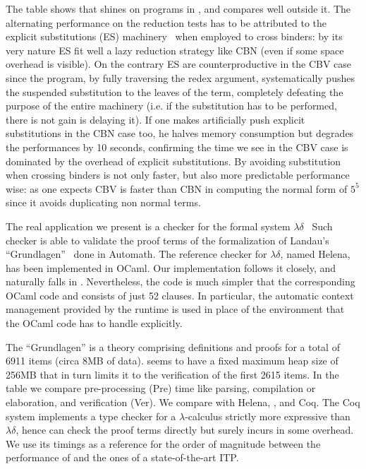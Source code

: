 \documentclass{llncs}
\begin{document}
The table shows that \elpi{} shines on programs in \rff{}, and compares well
outside it. The alternating performance \tedius{} on the reduction tests has
to be attributed to the explicit substitutions (ES) machinery~\cite{DBLP:journals/jar/LiangNQ04} when employed to cross binders:
by its very nature ES fit well a lazy reduction strategy like
CBN (even if some space
overhead is visible).  On the contrary ES are counterproductive
in the CBV case since the program, by fully traversing the redex argument,
systematically pushes the suspended substitution to the leaves of the
term, completely defeating the purpose of the entire machinery (i.e. if the
substitution has to be performed, there is not gain is delaying it).
If one makes \tedius{} artificially
push explicit substitutions in the CBN case too, he halves memory consumption
but degrades the performances by 10 seconds, confirming the
time we see in the CBV case is dominated by the overhead of explicit substitutions. By avoiding substitution when crossing binders
\elpi{} is not only faster, but also more predictable performance wise: as one
expects CBV is faster than CBN in computing the normal form of $5^5$ since
it avoids duplicating non normal terms.

The real application we present is a checker for the formal system
$\lambda\delta$~\cite{lambdadeltaJ1,lambdadeltaJ3a} Such
checker is able to validate the proof terms of the formalization of Landau's
``Grundlagen''~\cite{Jut79} done in Automath. The reference checker for
$\lambda\delta$, named Helena, has been implemented in OCaml.
Our \lp{} implementation follows it closely, and
naturally falls in \rff{}.
Nevertheless, the \lp{} code is much simpler that the corresponding OCaml code
and consists of just 52 clauses. In particular, the automatic
context management provided by the \lp{} runtime is used in place of the
environment that the OCaml code has to handle explicitly.

The ``Grundlagen'' is a theory comprising definitions and proofs
for a total of 6911 items (circa 8MB of data).
\tedius{} seems to have a fixed maximum heap size of 256MB that in turn
limits it to the verification of the first 2615 items.
In the table we compare pre-processing (Pre) time like parsing, compilation
or elaboration, and verification (Ver).
We compare \elpi{} with Helena, \tedius{}, and Coq.
The Coq system implements a
type checker for a $\lambda$-calculus strictly more expressive than
$\lambda\delta$, hence can check the proof terms
directly but surely incurs in some overhead. 
We use its timings as a
reference for the order of magnitude between the performance of \elpi{} and
the ones of a state-of-the-art ITP.
\end{document}
